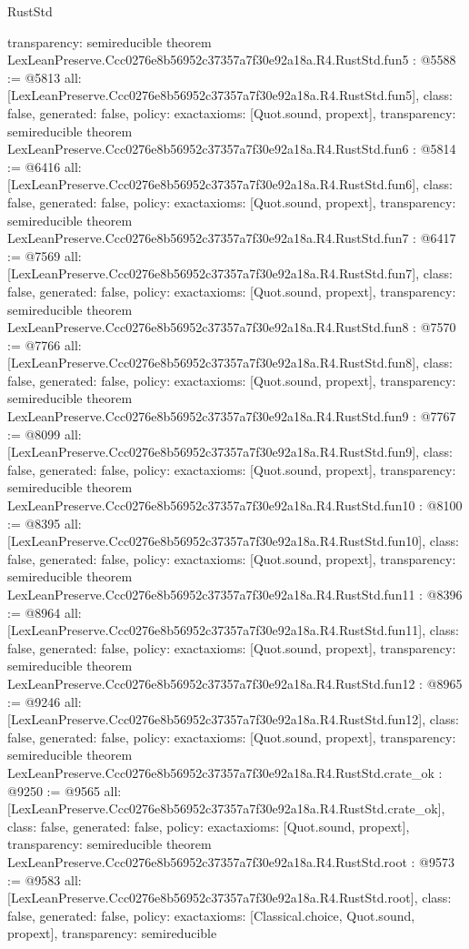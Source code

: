 \begin{lexlean}{RustStd}
\begin{coremodule}
{  transparency: semireducible
}
theorem LexLeanPreserve.Ccc0276e8b56952c37357a7f30e92a18a.R4.RustStd.fun5 : @5588 := @5813 {
  all: [LexLeanPreserve.Ccc0276e8b56952c37357a7f30e92a18a.R4.RustStd.fun5],
  class: false,
  generated: false,
  policy: exact{axioms: [Quot.sound, propext]},
  transparency: semireducible
}
theorem LexLeanPreserve.Ccc0276e8b56952c37357a7f30e92a18a.R4.RustStd.fun6 : @5814 := @6416 {
  all: [LexLeanPreserve.Ccc0276e8b56952c37357a7f30e92a18a.R4.RustStd.fun6],
  class: false,
  generated: false,
  policy: exact{axioms: [Quot.sound, propext]},
  transparency: semireducible
}
theorem LexLeanPreserve.Ccc0276e8b56952c37357a7f30e92a18a.R4.RustStd.fun7 : @6417 := @7569 {
  all: [LexLeanPreserve.Ccc0276e8b56952c37357a7f30e92a18a.R4.RustStd.fun7],
  class: false,
  generated: false,
  policy: exact{axioms: [Quot.sound, propext]},
  transparency: semireducible
}
theorem LexLeanPreserve.Ccc0276e8b56952c37357a7f30e92a18a.R4.RustStd.fun8 : @7570 := @7766 {
  all: [LexLeanPreserve.Ccc0276e8b56952c37357a7f30e92a18a.R4.RustStd.fun8],
  class: false,
  generated: false,
  policy: exact{axioms: [Quot.sound, propext]},
  transparency: semireducible
}
theorem LexLeanPreserve.Ccc0276e8b56952c37357a7f30e92a18a.R4.RustStd.fun9 : @7767 := @8099 {
  all: [LexLeanPreserve.Ccc0276e8b56952c37357a7f30e92a18a.R4.RustStd.fun9],
  class: false,
  generated: false,
  policy: exact{axioms: [Quot.sound, propext]},
  transparency: semireducible
}
theorem LexLeanPreserve.Ccc0276e8b56952c37357a7f30e92a18a.R4.RustStd.fun10 : @8100 := @8395 {
  all: [LexLeanPreserve.Ccc0276e8b56952c37357a7f30e92a18a.R4.RustStd.fun10],
  class: false,
  generated: false,
  policy: exact{axioms: [Quot.sound, propext]},
  transparency: semireducible
}
theorem LexLeanPreserve.Ccc0276e8b56952c37357a7f30e92a18a.R4.RustStd.fun11 : @8396 := @8964 {
  all: [LexLeanPreserve.Ccc0276e8b56952c37357a7f30e92a18a.R4.RustStd.fun11],
  class: false,
  generated: false,
  policy: exact{axioms: [Quot.sound, propext]},
  transparency: semireducible
}
theorem LexLeanPreserve.Ccc0276e8b56952c37357a7f30e92a18a.R4.RustStd.fun12 : @8965 := @9246 {
  all: [LexLeanPreserve.Ccc0276e8b56952c37357a7f30e92a18a.R4.RustStd.fun12],
  class: false,
  generated: false,
  policy: exact{axioms: [Quot.sound, propext]},
  transparency: semireducible
}
theorem LexLeanPreserve.Ccc0276e8b56952c37357a7f30e92a18a.R4.RustStd.crate_ok : @9250 := @9565 {
  all: [LexLeanPreserve.Ccc0276e8b56952c37357a7f30e92a18a.R4.RustStd.crate_ok],
  class: false,
  generated: false,
  policy: exact{axioms: [Quot.sound, propext]},
  transparency: semireducible
}
theorem LexLeanPreserve.Ccc0276e8b56952c37357a7f30e92a18a.R4.RustStd.root : @9573 := @9583 {
  all: [LexLeanPreserve.Ccc0276e8b56952c37357a7f30e92a18a.R4.RustStd.root],
  class: false,
  generated: false,
  policy: exact{axioms: [Classical.choice, Quot.sound, propext]},
  transparency: semireducible
}


\end{coremodule}
\end{lexlean}
